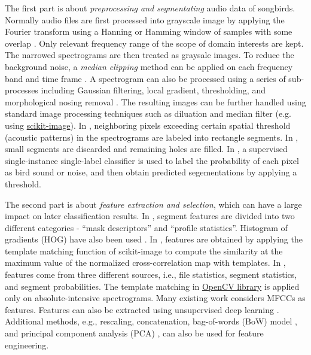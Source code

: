 \documentclass{article} %
\begin{document}
The first part is about {\em preprocessing and segmentating} audio data of songbirds. Normally audio files are first processed into grayscale image by applying the Fourier transform using a Hanning or Hamming window of samples with some overlap \cite{Lasseck13, mlsp1}. Only relevant frequency range of the scope of domain interests are kept. The narrowed spectrograms are then treated as graysale images. To reduce the background noise, a {\em median clipping} method can be applied on each frequency band and time frame
\cite{mlsp1}. A spectrogram can also be processed using a series of sub-processes including Gaussian filtering, local gradient, thresholding, and morphological nosing removal \cite{fodor2013ninth}. The resulting images can be further handled using standard image processing techniques such as diluation and median filter (e.g. using \href{http://scikit-image.org/}{scikit-image}). In \cite{Lasseck13}, neighboring pixels exceeding certain spatial threshold (acoustic patterns) in the spectrograms are labeled into rectangle segments. In \cite{fodor2013ninth}, small segments are discarded and remaining holes are filled. In \cite{mlsp1}, a supervised single-instance single-label classifier is used to label the probability of each pixel as bird sound or noise, and then obtain predicted segementations by applying a threshold.

The second part is about {\em feature extraction and selection}, which can have a large impact on later classification results. In \cite{mlsp1}, segment features are divided into two different categories - ``mask descriptors'' and ``profile statistics''. Histogram of gradients (HOG) have also been used \cite{mlsp1}. In \cite{fodor2013ninth}, features are obtained by applying the template matching function of scikit-image to compute the similarity at the maximum value of the normalized cross-correlation map with templates. In \cite{Lasseck13}, features come from three different sources, i.e., file statistics, segment statistics, and segment probabilities. The template matching in \href{http://opencv.org}{OpenCV library} is applied only on absolute-intensive spectrograms. Many existing work \cite{Stowell_NIPSW13,dufour2013clusterized,chennovel13,Massaron13} considers MFCCs%
as features.  Features can also be extracted using unsupervised deep learning \cite{mencialearning2013}. Additional methods, e.g., rescaling\cite{mlsp1}, concatenation\cite{dufour2013clusterized}, bag-of-words (BoW) model \cite{Li_CVPR05}, and principal component analysis (PCA) \cite{jolliffe2005principal}, can also be used for feature engineering. 
\end{document}
